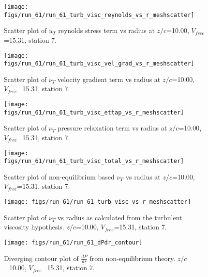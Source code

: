 \begin{figure}[H]
\centering
\texttt{[image: figs/run\_61/run\_61\_turb\_visc\_reynolds\_vs\_r\_meshscatter]}
\caption{Scatter plot of $
u_T$ reynolds stress term vs radius at $z/c$=10.00, $V_{free}$=15.31, station 7.}
\end{figure}


\begin{figure}[H]
\centering
\texttt{[image: figs/run\_61/run\_61\_turb\_visc\_vel\_grad\_vs\_r\_meshscatter]}
\caption{Scatter plot of $\nu_T$ velocity gradient term vs radius at $z/c$=10.00, $V_{free}$=15.31, station 7.}
\end{figure}


\begin{figure}[H]
\centering
\texttt{[image: figs/run\_61/run\_61\_turb\_visc\_ettap\_vs\_r\_meshscatter]}
\caption{Scatter plot of $\nu_T$ pressure relaxation term vs radius at $z/c$=10.00, $V_{free}$=15.31, station 7.}
\end{figure}


\begin{figure}[H]
\centering
\texttt{[image: figs/run\_61/run\_61\_turb\_visc\_total\_vs\_r\_meshscatter]}
\caption{Scatter plot of non-equilibrium based $\nu_T$ vs radius at $z/c$=10.00, $V_{free}$=15.31, station 7.}
\end{figure}


\begin{figure}[H]
\centering
\texttt{[image: figs/run\_61/run\_61\_turb\_visc\_vs\_r\_meshscatter]}
\caption{Scatter plot of $\nu_T$ vs radius as calculated from the turbulent viscosity hypothesis. $z/c$=10.00, $V_{free}$=15.31, station 7.}
\end{figure}


\begin{figure}[H]
\centering
\texttt{[image: figs/run\_61/run\_61\_dPdr\_contour]}
\caption{Diverging contour plot of $\frac{d\bar{P}}{dr}$ from non-equilibrium theory. $z/c$=10.00, $V_{free}$=15.31, station 7.}
\end{figure}


